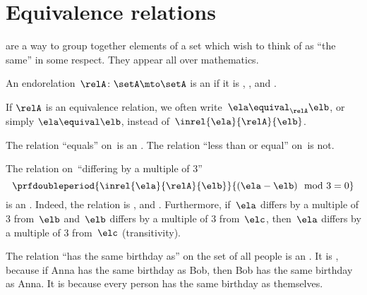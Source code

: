
\section{Equivalence relations}


  are a way to group together elements of a set which wish to think of as ``the same'' in some respect. They appear all over mathematics. 

\begin{ctdefinition}
    \label{def:equivalence-relation}
    An endorelation~$\relA\colon \setA\mto \setA$ is an  if it is , , and .
    
    If $\relA$ is an equivalence relation, we often write~$\ela\equival_\relA \elb$, or simply $\ela\equival \elb$, instead of~$\inrel{\ela}{\relA}{\elb}$.
\end{ctdefinition}

\begin{example}
    The relation ``equals'' on~\natnumbers is an .
    The relation ``less than or equal'' on~\natnumbers is not.
\end{example}

\begin{example}
    The relation on~\natnumbers ``differing by a multiple of 3''
    \begin{equation}
        \prfdoubleperiod{
            \inrel{\ela}{\relA}{\elb}
        }{
            (\ela-\elb) \mod 3 = 0
        }
    \end{equation}
    is an .
    Indeed, the relation is , and .
    Furthermore, if~$\ela$ differs by a multiple of 3 from~$\elb$ and~$\elb$ differs by a multiple of 3 from~$\elc$, then~$\ela$ differs by a multiple of 3 from~$\elc$ (transitivity).
\end{example}

\begin{example}
    The relation ``has the same birthday as'' on the set of all people is an .
    It is , because if Anna has the same birthday as Bob, then Bob has the same birthday as Anna.
    It is  because every person has the same birthday as themselves.
\end{example}

